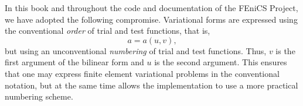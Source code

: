 In this book and throughout the code and documentation of the FEniCS
Project, we have adopted the following compromise. Variational forms
are expressed using the conventional \emph{order} of trial and test
functions, that is,
\begin{equation}
  a = a(u, v),
\end{equation}
but using an unconventional \emph{numbering} of trial and test
functions. Thus, $v$ is the first argument of the bilinear form and
$u$ is the second argument. This ensures that one may express finite
element variational problems in the conventional notation, but at the
same time allows the implementation to use a more practical numbering
scheme.
